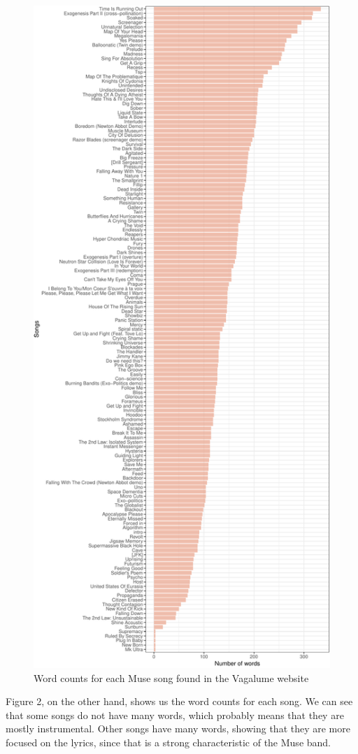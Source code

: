 \documentclass[]{article}
\begin{document}
\begin{figure}[H]

{\centering \includegraphics{report_files/figure-latex/unnamed-chunk-8-1} 

}

\caption{Word counts for each Muse song found in the Vagalume website}\label{fig:unnamed-chunk-8}
\end{figure}

Figure 2, on the other hand, shows us the word counts for each song. We
can see that some songs do not have many words, which probably means
that they are mostly instrumental. Other songs have many words, showing
that they are more focused on the lyrics, since that is a strong
characteristic of the Muse band.


\end{document}
